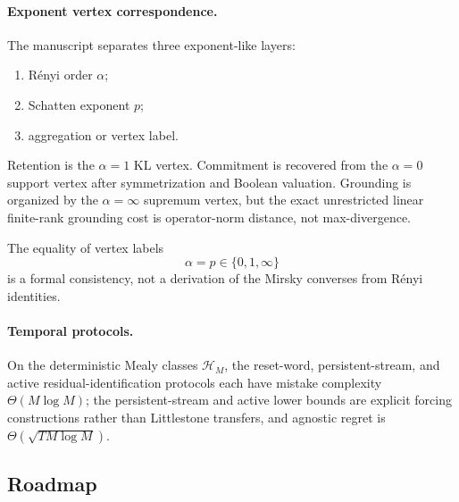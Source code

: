 \documentclass[12pt]{article}
\theoremstyle{definition}
\begin{document}
\paragraph{Exponent vertex correspondence.}
The manuscript separates three exponent-like layers:
\begin{enumerate}[nosep,label=(\arabic*)]
\item R\'enyi order $\alpha$;
\item Schatten exponent $p$;
\item aggregation or vertex label.
\end{enumerate}

Retention is the $\alpha=1$ KL vertex.  Commitment is recovered from the
$\alpha=0$ support vertex after symmetrization and Boolean valuation.
Grounding is organized by the $\alpha=\infty$ supremum vertex, but the exact
unrestricted linear finite-rank grounding cost is operator-norm distance, not
max-divergence.

The equality of vertex labels
\[
\alpha=p\in\{0,1,\infty\}
\]
is a formal consistency, not a derivation of the Mirsky converses from
R\'enyi identities.

\paragraph{Temporal protocols.}
On the deterministic Mealy classes $\mathcal H_M$, the reset-word,
persistent-stream, and active residual-identification protocols each have
mistake complexity $\Theta(M\log M)$; the persistent-stream and active
lower bounds are explicit forcing constructions rather than Littlestone
transfers, and agnostic regret is $\Theta(\sqrt{TM\log M})$.

\subsection{Roadmap}
\label{subsec:roadmap}
\end{document}
